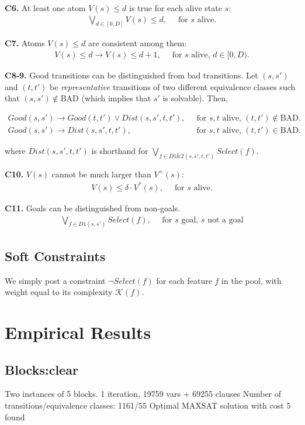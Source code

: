 \documentclass[a4paper]{article}
\newcommand{\smallpar}[1]{{\vspace{10pt}\noindent \bf #1.}}
\newcommand{\badtx}{\ensuremath{\mathrm{BAD}}}
\begin{document}
\smallpar{C6}
At least one atom $V(s) \leq d$ is true for each alive state $s$:
\begin{align}
 \bigvee_{d \in [0, D]} V(s) \leq d,&\;\; \text{for $s$ alive.}
\end{align}

\smallpar{C7}
Atoms $V(s) \leq d$ are consistent among them:
\begin{align}
 V(s) \leq d \rightarrow V(s) \leq d+1,&\;\; \text{for $s$ alive, $d \in [0, D)$.}
\end{align}

\smallpar{C8-9}
Good transitions can be distinguished from bad transitions.
Let $(s, s')$ and $(t, t')$ be \emph{representative} transitions
of two different equivalence classes such that $(s, s') \not\in \badtx$
(which implies that $s'$ is solvable). Then,

\begin{align}
 Good(s, s') \rightarrow Good(t, t') \lor
 Dist(s, s', t, t'),&\;\; \text{for $s, t$ alive, $(t, t') \not\in \badtx$.} \\
 Good(s, s') \rightarrow
 Dist(s, s', t, t'),&\;\; \text{for $s, t$ alive, $(t, t') \in \badtx$.}
\end{align}

\noindent where $Dist(s, s', t, t')$ is shorthand for $\bigvee_{f \in D1\&2(s, s', t, t')} Select(f)$.

\smallpar{C10}
$V(s)$ cannot be much larger than $V^+(s)$:
\begin{align}
 V(s) \leq \delta \cdot V^*(s),&\;\; \text{for $s$ alive.}
\end{align}


\smallpar{C11}
Goals can be distinguished from non-goals.
\begin{align}
\bigvee_{f \in D1(s, s')} Select(f),&\;\; \text{for $s$ goal, $s$ not a goal}
\end{align}


\subsection{Soft Constraints}
We simply post a constraint $\neg Select(f)$ for each feature $f$ in the pool, with weight equal to its complexity $\mathcal{K}(f)$.

\section{Empirical Results}

\subsection{Blocks:clear}
Two instances of 5 blocks.
1 iteration, 19759 vars + 69255 clauses
Number of transitions/equivalence classes: 1161/55
Optimal MAXSAT solution with cost 5 found
\end{document}

